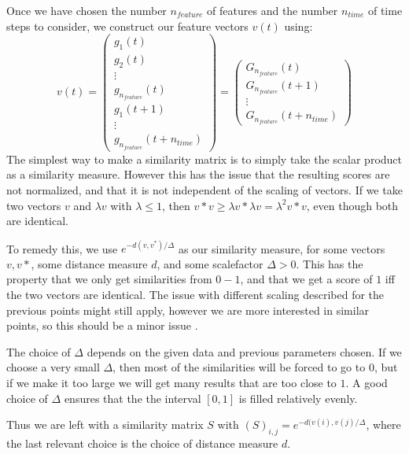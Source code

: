 Once we have chosen the number $n_{feature}$ of features and the number $n_{time}$ of time steps to consider, we construct our feature vectors $v(t)$ using:
\[
v(t)= \left (
\begin{matrix}
g_1(t) \\
g_2(t) \\
\vdots \\
g_{n_{feature}}(t) \\
g_{1}(t+1) \\
\vdots \\
g_{n_{feature}}(t+n_{time})
\end{matrix}
\right ) = \left (
\begin{matrix}
G_{n_{feature}}(t) \\
G_{n_{feature}}(t+1) \\
\vdots \\
G_{n_{feature}}(t+n_{time})
\end{matrix}
\right )
\]
The simplest way to make a similarity matrix is to simply take the scalar product as a similarity measure. However this has the issue that the resulting scores are not normalized, and that it is not independent of the scaling of vectors. If we take two vectors $v$ and $\lambda v$ with $\lambda \leq 1$, then $v*v \geq \lambda v* \lambda v=\lambda^2 v*v$, even though both are identical. 

To remedy this, we use $e^{-d(v,v^*)/\Delta}$ as our similarity measure, for some vectors $v,v*$, some distance measure $d$, and some scalefactor $\Delta > 0$. This has the property that we only get similarities from $0-1$, and that we get a score of $1$ iff  the two vectors are identical. The issue with different scaling described for the previous points might still apply, however we are more interested in similar points, so this should be a minor issue .

The choice of $\Delta$ depends on the given data and previous parameters chosen. If we choose a very small $\Delta$, then most of the similarities will be forced to go to $0$, but if we make it too large we will get many results that are too close to $1$. A good choice of $\Delta$ ensures that the the interval $[0,1]$ is filled relatively evenly. 

Thus we are left with a similarity matrix $S$ with $(S)_{i,j}=e^{-d(v(i),v(j)/\Delta}$, where the last relevant choice is the choice of distance measure $d$.
